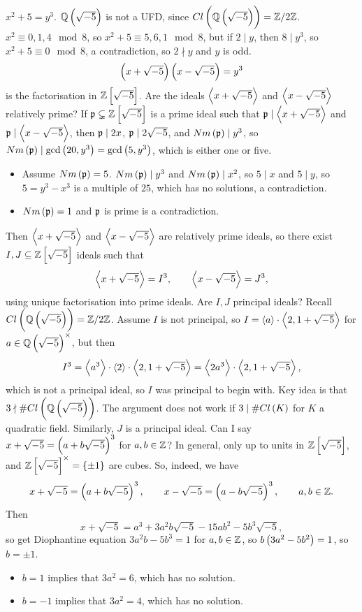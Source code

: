 \begin{example*}
$ x^2 + 5 = y^3 $. $ \Q\br{\sqrt{-5}} $ is not a UFD, since $ Cl\br{\Q\br{\sqrt{-5}}} = \Z / 2\Z $. $ x^2 \equiv 0, 1, 4 \mod 8 $, so $ x^2 + 5 \equiv 5, 6, 1 \mod 8 $, but if $ 2 \mid y $, then $ 8 \mid y^3 $, so $ x^2 + 5 \equiv 0 \mod 8 $, a contradiction, so $ 2 \nmid y $ and $ y $ is odd.
$$ \br{x + \sqrt{-5}}\br{x - \sqrt{-5}} = y^3 $$
is the factorisation in $ \Z\sbr{\sqrt{-5}} $. Are the ideals $ \left\langle x + \sqrt{-5} \right\rangle $ and $ \left\langle x - \sqrt{-5} \right\rangle $ relatively prime? If $ \pp \subsetneq \Z\sbr{\sqrt{-5}} $ is a prime ideal such that $ \mathfrak{p} \mid \left\langle x + \sqrt{-5} \right\rangle $ and $ \mathfrak{p} \mid \left\langle x - \sqrt{-5} \right\rangle $, then $ \mathfrak{p} \mid 2x $, $ \mathfrak{p} \mid 2\sqrt{-5} $, and $ Nm\br{\pp} \mid y^3 $, so $ Nm\br{\pp} \mid \gcd\br{20, y^3} = \gcd\br{5, y^3} $, which is either one or five.
\begin{itemize}
\item Assume $ Nm\br{\pp} = 5 $. $ Nm\br{\pp} \mid y^3 $ and $ Nm\br{\pp} \mid x^2 $, so $ 5 \mid x $ and $ 5 \mid y $, so $ 5 = y^3 - x^3 $ is a multiple of $ 25 $, which has no solutions, a contradiction.
\item $ Nm\br{\pp} = 1 $ and $ \mathfrak{p} $ is prime is a contradiction.
\end{itemize}
Then $ \left\langle x + \sqrt{-5} \right\rangle $ and $ \left\langle x - \sqrt{-5} \right\rangle $ are relatively prime ideals, so there exist $ I, J \subseteq \Z\sbr{\sqrt{-5}} $ ideals such that
$$ \left\langle x + \sqrt{-5} \right\rangle = I^3, \qquad \left\langle x - \sqrt{-5} \right\rangle = J^3, $$
using unique factorisation into prime ideals. Are $ I, J $ principal ideals? Recall $ Cl\br{\Q\br{\sqrt{-5}}} = \Z / 2\Z $. Assume $ I $ is not principal, so $ I = \left\langle a \right\rangle \cdot \left\langle 2, 1 + \sqrt{-5} \right\rangle $ for $ a \in \Q\br{\sqrt{-5}}^\times $, but then
$$ I^3 = \left\langle a^3 \right\rangle \cdot \left\langle 2 \right\rangle \cdot \left\langle 2, 1 + \sqrt{-5} \right\rangle = \left\langle 2a^3 \right\rangle \cdot \left\langle 2, 1 + \sqrt{-5} \right\rangle, $$
which is not a principal ideal, so $ I $ was principal to begin with. Key idea is that $ 3 \nmid \#Cl\br{\Q\br{\sqrt{-5}}} $. The argument does not work if $ 3 \mid \#Cl\br{K} $ for $ K $ a quadratic field. Similarly, $ J $ is a principal ideal. Can I say $ x + \sqrt{-5} = \br{a + b\sqrt{-5}}^3 $ for $ a, b \in \mathbb{Z} $? In general, only up to units in $ \Z\sbr{\sqrt{-5}} $, and $ \Z\sbr{\sqrt{-5}}^\times = \cbr{\pm 1} $ are cubes. So, indeed, we have
$$ x + \sqrt{-5} = \br{a + b\sqrt{-5}}^3, \qquad x - \sqrt{-5} = \br{a - b\sqrt{-5}}^3, \qquad a, b \in \Z. $$
Then
$$ x + \sqrt{-5} = a^3 + 3a^2b\sqrt{-5} - 15ab^2 - 5b^3\sqrt{-5}, $$
so get Diophantine equation $ 3a^2b - 5b^3 = 1 $ for $ a, b \in \mathbb{Z} $, so $ b\br{3a^2 - 5b^2} = 1 $, so $ b = \pm 1 $.
\begin{itemize}
\item $ b = 1 $ implies that $ 3a^2 = 6 $, which has no solution.
\item $ b = -1 $ implies that $ 3a^2 = 4 $, which has no solution.
\end{itemize}
\end{example*}

